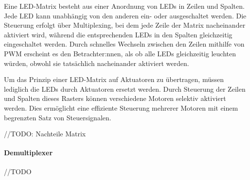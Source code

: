 Eine LED-Matrix besteht aus einer Anordnung von LEDs in Zeilen und Spalten.
Jede LED kann unabhängig von den anderen ein- oder ausgeschaltet werden.
Die Steuerung erfolgt über Multiplexing, bei dem jede Zeile der Matrix nacheinander aktiviert wird, während die entsprechenden LEDs in den Spalten gleichzeitig eingeschaltet werden.
Durch schnelles Wechseln zwischen den Zeilen mithilfe von \ac{PWM} erscheint es den Betrachter:nnen, als ob alle LEDs gleichzeitig leuchten würden, obwohl sie tatsächlich nacheinander aktiviert werden.

Um das Prinzip einer LED-Matrix auf Aktuatoren zu übertragen, müssen lediglich die LEDs durch Aktuatoren ersetzt werden.
Durch Steuerung der Zeilen und Spalten dieses Rasters können verschiedene Motoren selektiv aktiviert werden.
Dies ermöglicht eine effiziente Steuerung mehrerer Motoren mit einem begrenzten Satz von
Steuersignalen.

//TODO: Nachteile Matrix


\paragraph{Demultiplexer}
//TODO \newline
